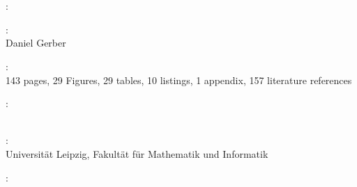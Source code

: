 \thispagestyle{empty}

\hfill

\vfill

~\\
\noindent{}\\



\noindent{}: \\
\myTitle 

\medskip

\noindent{}: \\
Daniel Gerber %

\medskip

\noindent{}: \\
143 pages, 29 Figures, 29 tables, 10 listings, 1 appendix, 157 literature references

\medskip

\noindent{}: \\
\myProf \\
\mySupervisor

\medskip

\noindent{}: \\
Universität Leipzig, Fakultät für Mathematik und Informatik

\medskip

\noindent{}: \\
\myTime
